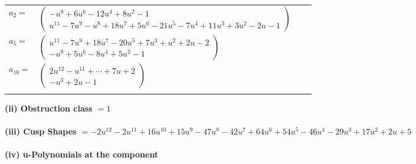 \documentclass[1p]{elsarticle_modified}
\theoremstyle{definition}
\begin{document}
\begin{tabular}{m{7pt} m{180pt} m{7pt} m{180pt} }
\flushright $a_{2}=$&$\begin{pmatrix}- u^8+6 u^6-12 u^4+8 u^2-1\\u^{11}-7 u^9- u^8+18 u^7+5 u^6-21 u^5-7 u^4+11 u^3+3 u^2-2 u-1\end{pmatrix}$ \\
\flushright $a_{5}=$&$\begin{pmatrix}u^{11}-7 u^9+18 u^7-20 u^5+7 u^3+u^2+2 u-2\\- u^8+5 u^6-8 u^4+5 u^2-1\end{pmatrix}$ \\
\flushright $a_{10}=$&$\begin{pmatrix}2 u^{12}- u^{11}+\cdots+7 u+2\\- u^3+2 u-1\end{pmatrix}$\\&\end{tabular}
\flushleft \textbf{(ii) Obstruction class $= 1$}\\~\\
\flushleft \textbf{(iii) Cusp Shapes $= -2 u^{12}-2 u^{11}+16 u^{10}+15 u^9-47 u^8-42 u^7+64 u^6+54 u^5-46 u^4-29 u^3+17 u^2+2 u+5$}\\~\\
\newpage\renewcommand{\arraystretch}{1}
\flushleft \textbf{(iv) u-Polynomials at the component}\newline \\
\end{document}
